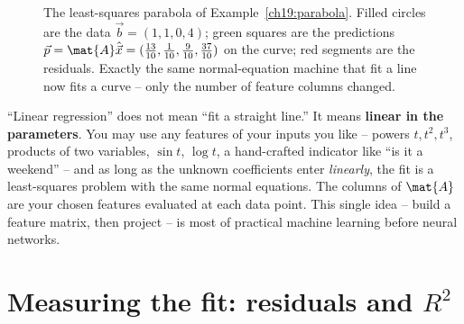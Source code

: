 \begin{figure}[H]
\centering
{}
\caption{The least-squares parabola of Example~\ref{ch19:parabola}. Filled circles are the data
$\vec{b}=(1,1,0,4)$; green squares are the predictions $\vec{p}=\mat{A}\hat{\vec{x}}
=(\tfrac{13}{10},\tfrac{1}{10},\tfrac{9}{10},\tfrac{37}{10})$ on the curve; red segments are the
residuals. Exactly the same normal-equation machine that fit a line now fits a curve -- only the
number of feature columns changed.}
\label{ch19:parabola-fit}
\end{figure}

\begin{focusbox}
``Linear regression'' does not mean ``fit a straight line.'' It means \textbf{linear in the
parameters}. You may use any features of your inputs you like -- powers $t,t^2,t^3$, products of
two variables, $\sin t$, $\log t$, a hand-crafted indicator like ``is it a weekend'' -- and as long
as the unknown coefficients enter \emph{linearly}, the fit is a least-squares problem with the same
normal equations. The columns of $\mat{A}$ are your chosen features evaluated at each data point.
This single idea -- build a feature matrix, then project -- is most of practical machine learning
before neural networks.
\end{focusbox}

\section{Measuring the fit: residuals and \texorpdfstring{$R^2$}{R-squared}}

